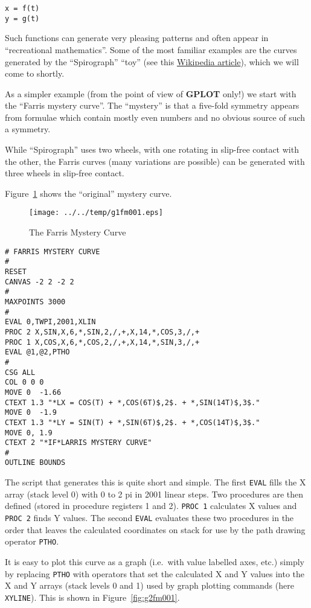 \documentclass[a4paper,twoside,11pt]{article}
\makeatletter
\def\maxwidth{%
  \ifdim\Gin@nat@width>\linewidth
    \linewidth
  \else
    \Gin@nat@width
  \fi
}
\newcommand{\newpara}{\par\vspace{4mm}\noindent}
\makeatother
\begin{document}
\begin{lstlisting}
x = f(t)
y = g(t)
\end{lstlisting}

\newpara
Such functions can generate very pleasing patterns and often appear in
``recreational mathematics''. Some of the most familiar examples are the
curves generated by the ``Spirograph'' ``toy'' (see this
\href{https://en.wikipedia.org/wiki/Spirograph}{Wikipedia article}),
which we will come to shortly.

\newpara
As a simpler example (from the point of view of \textbf{GPLOT} only!) we start
with the ``Farris mystery curve''. The ``mystery'' is that a five-fold
symmetry appears from formulae which contain mostly even numbers and no obvious
source of such a symmetry.

\newpara
While ``Spirograph'' uses two wheels, with one rotating in slip-free
contact with the other, the Farris curves (many variations are possible)
can be generated with three wheels in slip-free contact.

\newpara
Figure~\ref{fig:g1fm001} shows the ``original'' mystery curve.

\begin{figure}
  \centering
  \texttt{[image: ../../temp/g1fm001.eps]}
  \caption{The Farris Mystery Curve}
  \label{fig:g1fm001}
\end{figure}

\begin{lstlisting}
# FARRIS MYSTERY CURVE
#
RESET
CANVAS -2 2 -2 2
#
MAXPOINTS 3000
#
EVAL 0,TWPI,2001,XLIN
PROC 2 X,SIN,X,6,*,SIN,2,/,+,X,14,*,COS,3,/,+
PROC 1 X,COS,X,6,*,COS,2,/,+,X,14,*,SIN,3,/,+
EVAL @1,@2,PTHO
#
CSG ALL
COL 0 0 0
MOVE 0  -1.66
CTEXT 1.3 "*LX = COS(T) + *,COS(6T)$,2$. + *,SIN(14T)$,3$." 
MOVE 0  -1.9
CTEXT 1.3 "*LY = SIN(T) + *,SIN(6T)$,2$. + *,COS(14T)$,3$." 
MOVE 0, 1.9
CTEXT 2 "*IF*LARRIS MYSTERY CURVE"
#
OUTLINE BOUNDS
\end{lstlisting}

\newpara
The script that generates this is quite short and simple. The first
\texttt{EVAL} fills the X array (stack level 0) with 0 to 2 pi in 2001
linear steps. Two procedures are then defined (stored in procedure
registers 1 and 2). \texttt{PROC\ 1} calculates X values and
\texttt{PROC\ 2} finds Y values. The second \texttt{EVAL} evaluates
these two procedures in the order that leaves the calculated coordinates
on stack for use by the path drawing operator \texttt{PTHO}.

\newpara
It is easy to plot this curve as a graph (i.e.~with value labelled axes,
etc.) simply by replacing \texttt{PTHO} with operators that set the
calculated X and Y values into the X and Y arrays (stack levels 0 and 1)
used by graph plotting commands (here \texttt{XYLINE}). This is
shown in Figure~\ref{fig:g2fm001}.
\end{document}
